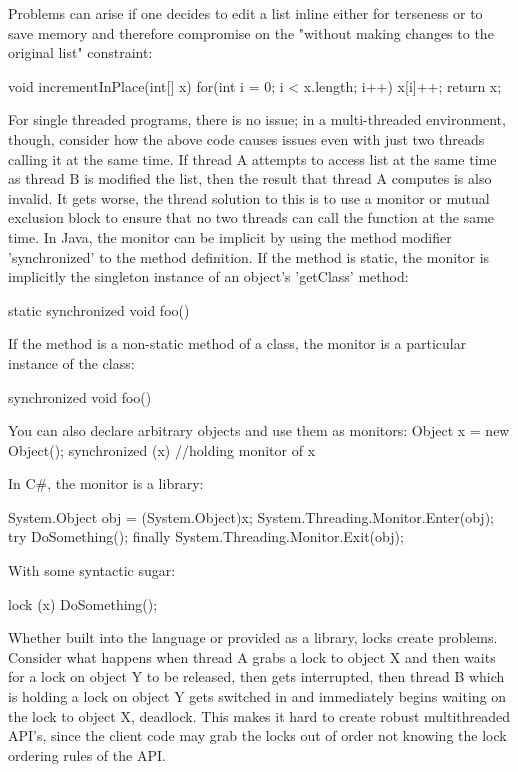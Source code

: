 Problems can arise if one decides to edit a list inline either for terseness or to save memory and therefore compromise on the 
"without making changes to the original list" constraint: 

void incrementInPlace(int[] x) {
	for(int i = 0; i < x.length; i++) { 
	  x[i]++;
         }
         return x;
}

For single threaded programs, there is no issue; in a multi-threaded environment, though, consider how the above code
causes issues even with just two threads calling it at the same time. If thread A attempts to access list at the same time as thread B is modified the list, then the result
that thread A computes is also invalid. It gets worse, the thread solution to this is to use a monitor or mutual exclusion block to ensure that no two threads can call the function at the
same time. In Java, the monitor can be implicit by using the method modifier 'synchronized' to the method definition. If the method is static,
the monitor is implicitly the singleton instance of an object's 'getClass' method:

static synchronized void foo() { }

If the method is a non-static method of a class, the monitor is a 
particular instance of the class:

synchronized void foo() { }

You can also declare arbitrary objects and use them as monitors:
Object x = new Object();
synchronized (x) {
 //holding monitor of x
}

In C\#, the monitor is a library:
 
System.Object obj = (System.Object)x;
System.Threading.Monitor.Enter(obj);
try
{
    DoSomething();
}
finally
{
    System.Threading.Monitor.Exit(obj);
} 

With some syntactic sugar:

lock (x)
{
    DoSomething();
}

Whether built into the language or provided as a library, locks create problems.
Consider what happens when thread A grabs a lock to object X and then waits for
a lock on object Y to be released, then gets interrupted, then thread B which is holding a lock
on object Y gets switched in and immediately begins waiting on the lock to object X, deadlock.
This makes it hard to create robust multithreaded API's, since the client code may grab the locks out of order not
knowing the lock ordering rules of the API. 

